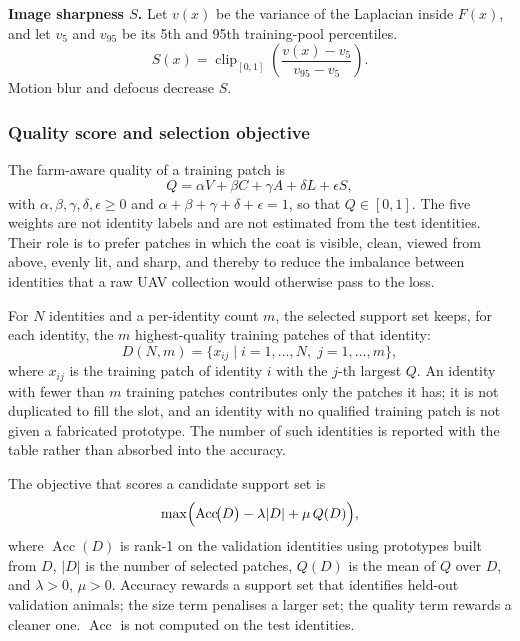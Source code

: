 \textbf{Image sharpness $S$.}
Let $v(x)$ be the variance of the Laplacian inside $F(x)$, and let $v_{5}$ and $v_{95}$ be its 5th and 95th training-pool percentiles.
\begin{equation}
    S(x)
    =
    \operatorname{clip}_{[0,1]}
    \!\left(
        \frac{v(x)-v_{5}}{v_{95}-v_{5}}
    \right).
    \label{eq:sharpness}
\end{equation}
Motion blur and defocus decrease $S$.

\subsubsection{Quality score and selection objective}
\label{sec:objective}

The farm-aware quality of a training patch is
\begin{equation}
    Q
    =
    \alpha V+\beta C+\gamma A+\delta L+\epsilon S,
    \label{eq:quality}
\end{equation}
with $\alpha,\beta,\gamma,\delta,\epsilon\ge 0$ and $\alpha+\beta+\gamma+\delta+\epsilon=1$, so that $Q\in[0,1]$. The five weights are not identity labels and are not estimated from the test identities. Their role is to prefer patches in which the coat is visible, clean, viewed from above, evenly lit, and sharp, and thereby to reduce the imbalance between identities that a raw UAV collection would otherwise pass to the loss.

For $N$ identities and a per-identity count $m$, the selected support set keeps, for each identity, the $m$ highest-quality training patches of that identity:
\begin{equation}
    D(N,m)
    =
    \bigl\{
        x_{ij}
        \mid
        i=1,\ldots,N,\;
        j=1,\ldots,m
    \bigr\},
    \label{eq:support-set}
\end{equation}
where $x_{ij}$ is the training patch of identity $i$ with the $j$-th largest $Q$. An identity with fewer than $m$ training patches contributes only the patches it has; it is not duplicated to fill the slot, and an identity with no qualified training patch is not given a fabricated prototype. The number of such identities is reported with the table rather than absorbed into the accuracy.

The objective that scores a candidate support set is
\begin{equation}
    \max \Bigl(
        \operatorname{Acc}\!\bigl(D\bigr)
        -\lambda \lvert D\rvert
        +\mu \, Q(D)
    \Bigr),
    \label{eq:objective}
\end{equation}
where $\operatorname{Acc}(D)$ is rank-1 on the validation identities using prototypes built from $D$, $\lvert D\rvert$ is the number of selected patches, $Q(D)$ is the mean of $Q$ over $D$, and $\lambda>0$, $\mu>0$. Accuracy rewards a support set that identifies held-out validation animals; the size term penalises a larger set; the quality term rewards a cleaner one. $\operatorname{Acc}$ is not computed on the test identities.

